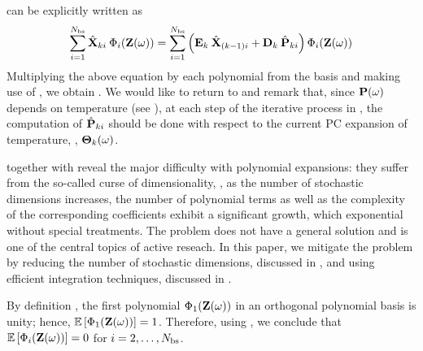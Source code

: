  can be explicitly written as
\[
  \sum_{i = 1}^{\pcterms} \pcc{\vX}_{ki} \: \pcb_i(\vZ(\o)) = \sum_{i = 1}^{\pcterms} \left( \mE_k \: \pcc{\vX}_{(k - 1)i} + \mD_k \: \pcc{\vP}_{ki} \right) \pcb_i(\vZ(\o))
\]
Multiplying the above equation by each polynomial from the basis and making use of , we obtain . We would like to return to  and remark that, since $\mathbf{P}(\omega)$ depends on temperature (see ), at each step of the iterative process in , the computation of $\hat{\mathbf{P}}_{ki}$ should be done with respect to the current PC expansion of temperature, \ie, ${\boldsymbol\Theta}_k(\omega)$.

 together with  reveal the major difficulty with polynomial expansions: they suffer from the so-called curse of dimensionality, \ie, as the number of stochastic dimensions increases, the number of polynomial terms as well as the complexity of the corresponding coefficients exhibit a significant growth, which exponential without special treatments. The problem does not have a general solution and is one of the central topics of active reseach. In this paper, we mitigate the problem by reducing the number of stochastic dimensions, discussed in , and using efficient integration techniques, discussed in .

By definition \cite{xiu2010}, the first polynomial $\Phi_1(\mathbf{Z}(\omega))$ in an orthogonal polynomial basis is unity; hence, $\mathbb{E}\left[\Phi_1(\mathbf{Z}(\omega))\right] = 1$. Therefore, using , we conclude that $\mathbb{E}\left[\Phi_i(\mathbf{Z}(\omega))\right] = 0$ for $i = 2, \dotsc, {N_\text{bs}}$.

